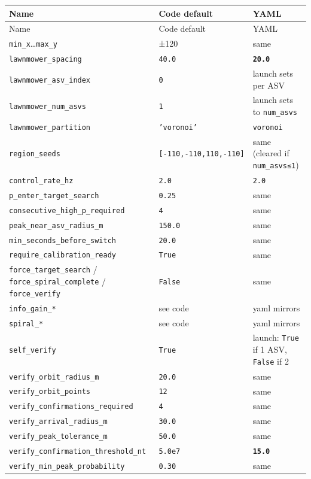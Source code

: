\begin{center}
\small
\begin{longtable}{@{}llp{7.2cm}@{}}
\toprule
Name & Code default & YAML \\
\midrule
\endfirsthead
\toprule
Name & Code default & YAML \\
\midrule
\endhead
\texttt{min\_x}…\texttt{max\_y} & ±120 & same \\
\texttt{lawnmower\_spacing} & \texttt{40.0} & \textbf{\texttt{20.0}} \\
\texttt{lawnmower\_asv\_index} & \texttt{0} & launch sets per ASV \\
\texttt{lawnmower\_num\_asvs} & \texttt{1} & launch sets to \texttt{num\_asvs} \\
\texttt{lawnmower\_partition} & \texttt{'voronoi'} & \texttt{voronoi} \\
\texttt{region\_seeds} & \texttt{[-110,-110,110,-110]} & same (cleared if \texttt{num\_asvs≤1}) \\
\texttt{control\_rate\_hz} & \texttt{2.0} & \texttt{2.0} \\
\texttt{p\_enter\_target\_search} & \texttt{0.25} & same \\
\texttt{consecutive\_high\_p\_required} & \texttt{4} & same \\
\texttt{peak\_near\_asv\_radius\_m} & \texttt{150.0} & same \\
\texttt{min\_seconds\_before\_switch} & \texttt{20.0} & same \\
\texttt{require\_calibration\_ready} & \texttt{True} & same \\
\texttt{force\_target\_search} / \texttt{force\_spiral\_complete} / \texttt{force\_verify} & \texttt{False} & same \\
\texttt{info\_gain\_*} & see code & yaml mirrors \\
\texttt{spiral\_*} & see code & yaml mirrors \\
\texttt{self\_verify} & \texttt{True} & launch: \texttt{True} if 1 ASV, \texttt{False} if 2 \\
\texttt{verify\_orbit\_radius\_m} & \texttt{20.0} & same \\
\texttt{verify\_orbit\_points} & \texttt{12} & same \\
\texttt{verify\_confirmations\_required} & \texttt{4} & same \\
\texttt{verify\_arrival\_radius\_m} & \texttt{30.0} & same \\
\texttt{verify\_peak\_tolerance\_m} & \texttt{50.0} & same \\
\texttt{verify\_confirmation\_threshold\_nt} & \texttt{5.0e7} & \textbf{\texttt{15.0}} \\
\texttt{verify\_min\_peak\_probability} & \texttt{0.30} & same \\
\bottomrule
\end{longtable}
\end{center}


